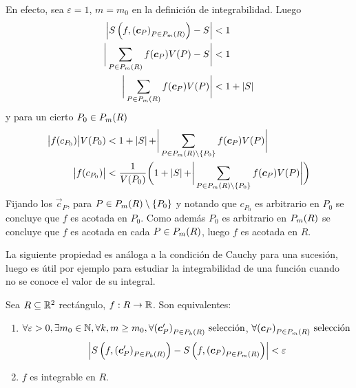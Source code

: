 \begin{demostracion}
En efecto, sea $ \varepsilon = 1 $, $ m = m_0 $ en la definici\'on de integrabilidad. Luego
\begin{align*}
\left\lvert S\left(f, {(\boldsymbol{c}_P)}_{P \in P_{m}(R)}\right) - S \right\rvert &< 1 \\
\biggr\lvert \sum_{P \in P_{m}(R)} f(\boldsymbol{c}_P) V(P) - S \biggl\rvert 	   &< 1 \\
\biggr\lvert \sum_{P \in P_{m}(R)} f(\boldsymbol{c}_P) V(P) \biggl\rvert 		   &< 1 + \left\lvert S\right\rvert
\end{align*}
y para un cierto $ P_0 \in P_{m}(R) $
\begin{align*}
    \bigr\lvert f(c_{P_0})\bigl\rvert V(P_0) 						   &< 1 + \left\lvert S\right\rvert +
    \biggr\lvert \sum_{P \in P_{m}(R) \setminus \{P_0\}} f(\boldsymbol{c}_P) V(P) \biggl\rvert \\
\bigr\lvert f(c_{P_0})\bigl\rvert 								   &< \frac{1}{V(P_0)}\biggl(1 + \left\lvert S\right\rvert + \biggr\lvert
\sum_{P \in P_{m}(R) \setminus \{P_0\}} f(\boldsymbol{c}_P) V(P) \biggl\rvert\biggr)
\end{align*}
Fijando los $ \vec{c}_P$, para $P \in P_{m}(R) \setminus \{P_0\} $ y notando que $ c_{P_0} $ es arbitrario en $ P_0 $ se concluye que $f $ es acotada en $ P_0 $. Como adem\'as $ P_0 $ es arbitrario en $P_{m}(R) $ se concluye que $ f $ es acotada en cada $ P \in P_{m}(R) $, luego $ f $ es acotada en $ R $.
\end{demostracion}

La siguiente propiedad es an\'aloga a la condici\'on de Cauchy para una sucesi\'on, luego es \'util por ejemplo para estudiar la integrabilidad de una funci\'on cuando no se conoce el valor de su integral.

\begin{proposicion}\label{pro:cauchy}
Sea $ R \subseteq \mathbb{R}^2 $ rect\'angulo, $ f:R \to \mathbb{R} $. Son equivalentes:
\begin{enumerate}
    \item $ \forall \varepsilon > 0, \exists m_0\in\mathbb{N}, \forall k, m
    \geq m_0, \forall {(\boldsymbol{c}'_P)}_{P \in P_{k}(R)} \allowbreak \text{ selecci\'on}$,
    $\forall {(\boldsymbol{c}_P)}_{P \in P_{m}(R)} \allowbreak \text{ selecci\'on} $
        \[ \left\lvert S\left(f, {(\boldsymbol{c}'_P)}_{P \in P_{k}(R)}\right) -
            S\left(f, {(\boldsymbol{c}_P)}_{P \in P_{m}(R)}\right)\right\rvert < \varepsilon \]
    \item $ f $ es integrable en $ R $.
\end{enumerate}
\end{proposicion}

